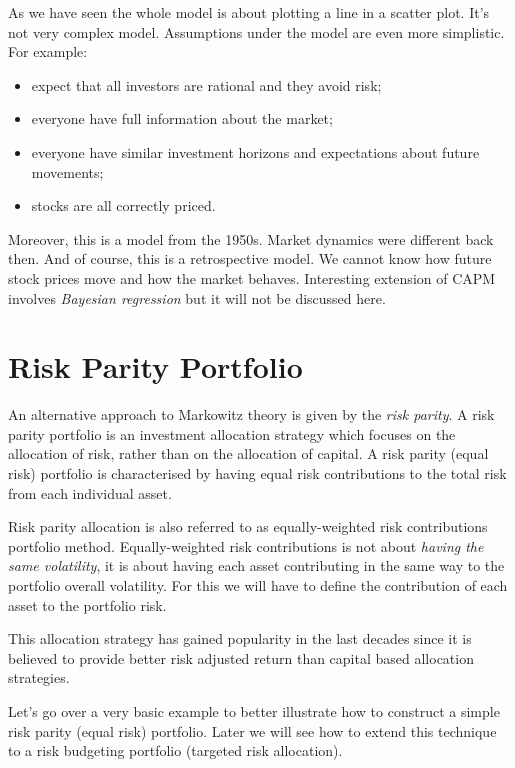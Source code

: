 As we have seen the whole model is about plotting a line in a scatter plot. It’s not very complex model. Assumptions under the model are even more simplistic. For example:
\begin{itemize}
\tightlist
\item expect that all investors are rational and they avoid risk;
\item everyone have full information about the market;
\item everyone have similar investment horizons and expectations about future movements;
\item stocks are all correctly priced.
\end{itemize}

Moreover, this is a model from the 1950s. Market dynamics were different back then. And of course, this is a retrospective model. We cannot know how future stock prices move and how the market behaves.
Interesting extension of CAPM involves \emph{Bayesian regression} but it will not be discussed here.

\section{Risk Parity Portfolio}
\label{risk-parity-portfolio}

An alternative approach to Markowitz theory is given by the
\emph{risk parity}. A risk parity portfolio is an investment allocation
strategy which focuses on the allocation of risk, rather than on the
allocation of capital. 
A risk parity (equal risk) portfolio is characterised by having equal risk contributions to the total risk from each individual asset. 

Risk parity allocation is also referred to as equally-weighted risk
contributions portfolio method. Equally-weighted risk contributions is
not about \emph{having the same volatility}, it is about having each
asset contributing in the same way to the portfolio overall volatility.
For this we will have to define the contribution of each asset to the
portfolio risk. 

This allocation strategy has gained popularity in the
last decades since it is believed to provide better risk adjusted return
than capital based allocation strategies.

Let's go over a very basic example to better illustrate how to construct
a simple risk parity (equal risk) portfolio. Later we will see how
to extend this technique to a risk budgeting portfolio (targeted risk
allocation).

